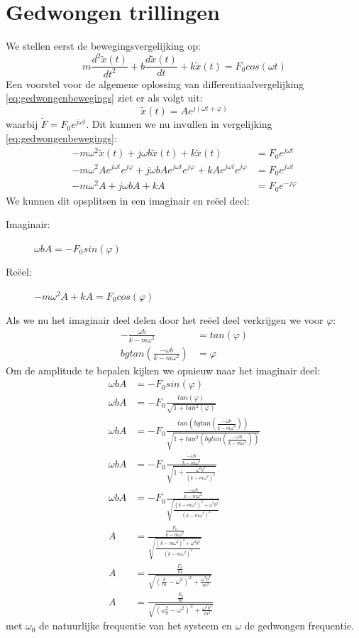 \documentclass[a4paper,kul]{kulakarticle} %
\begin{document}
\section{Gedwongen trillingen}
We stellen eerst de bewegingsvergelijking op:
\begin{equation}
	m\frac{d^2\widetilde{x}(t)}{dt^2}+b\frac{d\widetilde{x}(t)}{dt}+k\widetilde{x}(t) = F_0cos(\omega t)
	\label{eq:gedwongenbewegings}
\end{equation}
Een voorstel voor de algemene oplossing van differentiaalvergelijking \ref{eq:gedwongenbewegings} ziet er als volgt uit:
\begin{equation*}
	\widetilde{x}(t) = Ae^{j(\omega t +\varphi)}
\end{equation*}
waarbij $\widetilde{F} = F_0e^{j\omega t}$.
Dit kunnen we nu invullen in vergelijking \ref{eq:gedwongenbewegings}:
\begin{align*}
	-m\omega^2\widetilde{x}(t)+j\omega b\widetilde{x}(t)+k\widetilde{x}(t) & =F_0e^{j\omega t}\\
	-m\omega^2Ae^{j\omega t}e^{j\varphi}+j\omega bAe^{j\omega t}e^{j\varphi}+kAe^{j\omega t}e^{j\varphi} & =F_0e^{j\omega t}\\
	-m\omega^2A+j\omega bA+kA & =F_0e^{-j\varphi} 
\end{align*}
We kunnen dit opsplitsen in een imaginair en reëel deel:
\begin{description}
	\item[Imaginair:]$\omega bA = -F_0sin(\varphi)$
	\item[Reëel:] $-m\omega^2 A +kA = F_0cos(\varphi)$
\end{description}
Als we nu het imaginair deel delen door het reëel deel verkrijgen we voor $\varphi$:
\begin{align*}
	-\frac{\omega b}{k-m\omega^2} &= tan(\varphi)\\
	bgtan(\frac{-\omega b}{k-m\omega^2}) & =\varphi
\end{align*}
Om de amplitude te bepalen kijken we opnieuw naar het imaginair deel:
\begin{align*}
	\omega bA &= -F_0sin(\varphi)\\
	\omega bA &= -F_0\frac{tan(\varphi)}{\sqrt{1+tan^2(\varphi)}}\\
	\omega bA &= -F_0\frac{tan(bgtan(\frac{-\omega b}{k-m\omega^2}))}{\sqrt{1+tan^2(bgtan(\frac{-\omega b}{k-m\omega^2}))}}\\
	\omega bA &= -F_0\frac{\frac{-\omega b}{k-m\omega^2}}{\sqrt{1+\frac{\omega^2 b^2}{(k-m\omega^2)^2}}}\\
	\omega bA &= -F_0\frac{\frac{-\omega b}{k-m\omega^2}}{\sqrt{\frac{(k-m\omega^2)^2+\omega^2 b^2}{(k-m\omega^2)^2}}}\\
	A &= \frac{\frac{F_0}{k-m\omega^2}}{\sqrt{\frac{(k-m\omega^2)^2+\omega^2 b^2}{(k-m\omega^2)^2}}}\\
	A &= \frac{\frac{F_0}{m}}{\sqrt{(\frac{k}{m}-\omega^2)^2+\frac{\omega^2b^2}{m^2}}}\\
	A &= \frac{\frac{F_0}{m}}{\sqrt{(\omega_0^2-\omega^2)^2+\frac{\omega^2b^2}{m^2}}}	
\end{align*}
met $\omega_0$ de natuurlijke frequentie van het systeem en $\omega$ de gedwongen frequentie.
\newpage
\end{document}
